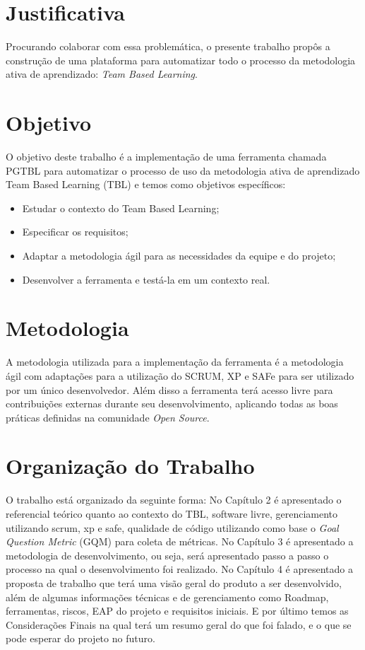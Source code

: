 \section{Justificativa}

Procurando colaborar com essa problemática, o presente trabalho propôs a construção de uma plataforma para automatizar
todo o processo da metodologia ativa de aprendizado: \textit{Team Based Learning}.

\section{Objetivo}

O objetivo deste trabalho é a implementação de uma ferramenta chamada PGTBL para automatizar o processo de uso da metodologia ativa de aprendizado Team Based Learning (TBL) e temos como objetivos específicos:

\begin{itemize}
  \item Estudar o contexto do Team Based Learning;
  \item Especificar os requisitos;
  \item Adaptar a metodologia ágil para as necessidades da equipe e do projeto;
  \item Desenvolver a ferramenta e testá-la em um contexto real.
\end{itemize}

\section{Metodologia}

A metodologia utilizada para a implementação da ferramenta é a metodologia ágil com adaptações para a utilização do SCRUM, XP e SAFe para ser utilizado por um único desenvolvedor. Além disso a ferramenta terá acesso livre para contribuições externas durante seu desenvolvimento, aplicando todas as boas práticas definidas na comunidade \textit{Open Source}.

\section{Organização do Trabalho}

O trabalho está organizado da seguinte forma: No Capítulo 2 é apresentado o referencial teórico quanto ao contexto do TBL, software livre, gerenciamento utilizando scrum, xp e safe, qualidade de código utilizando como base o \textit{Goal Question Metric} (GQM) para coleta de métricas. No Capítulo 3 é apresentado a metodologia de desenvolvimento, ou seja, será apresentado passo a passo o processo na qual o desenvolvimento foi realizado. No Capítulo 4 é apresentado a proposta de trabalho que terá uma visão geral do produto a ser desenvolvido, além de algumas informações técnicas e de gerenciamento como Roadmap, ferramentas, riscos, EAP do projeto e requisitos iniciais. E por último temos as Considerações Finais na qual terá um resumo geral do que foi falado, e o que se pode esperar do projeto no futuro.
